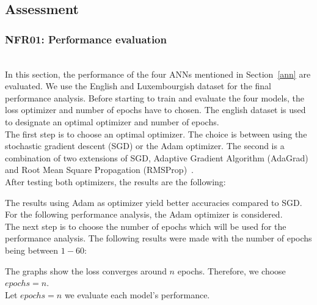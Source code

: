 % 

\subsection{Assessment}
\subsubsection{NFR01: Performance evaluation}~\\

In this section, the performance of the four ANNs mentioned in Section~\ref{ann}
are evaluated. We use the English and Luxembourgish dataset for the final
performance analysis. Before starting to train and evaluate the four models, the
loss optimizer and number of epochs have to chosen. The english dataset is used
to designate an optimal optimizer and number of epochs.\\

The first step is to choose an optimal optimizer. The choice is between using
the stochastic gradient descent (SGD) or the Adam optimizer. The second is a
combination of two extensions of SGD, Adaptive Gradient Algorithm (AdaGrad) and
Root Mean Square Propagation (RMSProp)~\cite{Adam}.\\

After testing both optimizers, the results are the following:


The results using Adam as optimizer yield better accuracies compared to SGD. For
the following performance analysis, the Adam optimizer is considered.\\

The next step is to choose the number of epochs which will be used for the
performance analysis. The following results were made with the number of epochs
being between $1-60$:


The graphs show the loss converges around $n$ epochs. Therefore, we choose
$epochs = n$.\\

Let $epochs = n$ we evaluate each model's performance.




